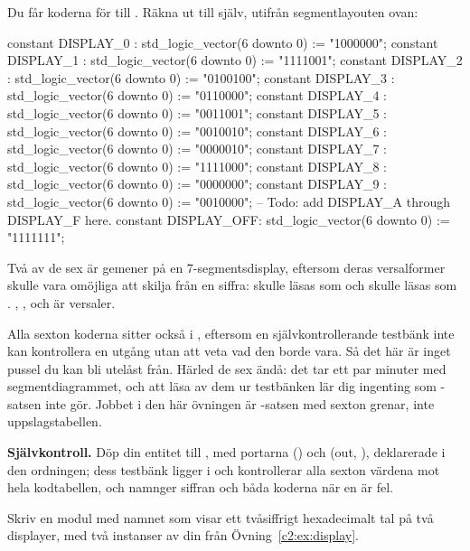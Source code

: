 Du får koderna för  till . Räkna ut  till  själv, utifrån
segmentlayouten ovan:

\begin{vhdlcode}
constant DISPLAY_0  : std_logic_vector(6 downto 0) := "1000000";
constant DISPLAY_1  : std_logic_vector(6 downto 0) := "1111001";
constant DISPLAY_2  : std_logic_vector(6 downto 0) := "0100100";
constant DISPLAY_3  : std_logic_vector(6 downto 0) := "0110000";
constant DISPLAY_4  : std_logic_vector(6 downto 0) := "0011001";
constant DISPLAY_5  : std_logic_vector(6 downto 0) := "0010010";
constant DISPLAY_6  : std_logic_vector(6 downto 0) := "0000010";
constant DISPLAY_7  : std_logic_vector(6 downto 0) := "1111000";
constant DISPLAY_8  : std_logic_vector(6 downto 0) := "0000000";
constant DISPLAY_9  : std_logic_vector(6 downto 0) := "0010000";
-- Todo: add DISPLAY_A through DISPLAY_F here.
constant DISPLAY_OFF: std_logic_vector(6 downto 0) := "1111111";
\end{vhdlcode}

Två av de sex är gemener på en 7-segmentsdisplay, eftersom deras versalformer skulle vara omöjliga
att skilja från en siffra:  skulle läsas som  och  skulle läsas som
. , ,  och  är versaler.

Alla sexton koderna sitter också i , eftersom en självkontrollerande testbänk
inte kan kontrollera en utgång utan att veta vad den borde vara. Så det här är inget pussel du kan
bli utelåst från. Härled de sex ändå: det tar ett par minuter med segmentdiagrammet, och att läsa
av dem ur testbänken lär dig ingenting som -satsen inte gör. Jobbet i den här övningen
är -satsen med sexton grenar, inte uppslagstabellen.


\begin{selfcheck}
\textbf{Självkontroll.} Döp din entitet till , med portarna 
() och  (out, ),
deklarerade i den ordningen; dess testbänk ligger i  och kontrollerar alla
sexton värdena mot hela kodtabellen, och namnger siffran och båda koderna när en är fel.
\end{selfcheck}

\label{c2:ex:hexdisplay}
Skriv en modul med namnet  som visar ett tvåsiffrigt hexadecimalt tal på två
displayer, med två instanser av din  från Övning~\ref{c2:ex:display}.


